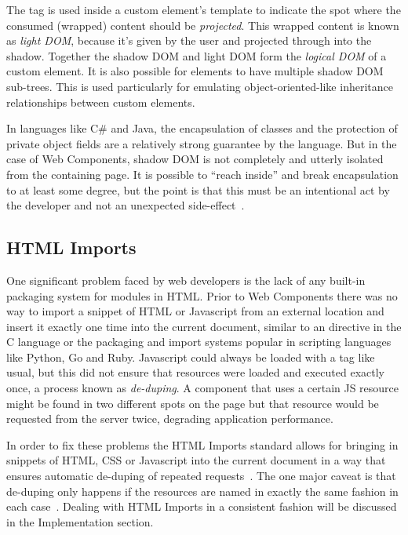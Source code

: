 The  tag is used inside a custom element's template to indicate the spot where the consumed (wrapped) content should be \textit{projected}. 
This wrapped content is known as 
\textit{light DOM}, 
because it's given by the user and projected through into the shadow.
Together the shadow DOM and light DOM form the \textit{logical DOM} of a custom element.
It is also possible for elements to have multiple shadow DOM sub-trees. 
This is used particularly for emulating object-oriented-like inheritance relationships between custom elements.

In languages like C\# and Java, the encapsulation of classes and the protection of private object fields are a relatively strong guarantee by the language.
But in the case of Web Components, shadow DOM is not completely and utterly isolated from the containing page.
It is possible to ``reach inside'' and break encapsulation to at least some degree, 
but the point is that this must be an intentional act by the developer and not an unexpected side-effect~\cite{bidelman2014}.

\subsection{HTML Imports}
One significant problem faced by web developers is the lack of any built-in packaging system for modules in HTML.
Prior to Web Components there was no way to import a snippet of HTML or Javascript from an external location and insert it exactly one time into the current document, 
similar to an  directive in the C language or the packaging and import systems popular in scripting languages like Python, Go and Ruby. 
Javascript could always be loaded with a  tag like usual, but this did not ensure that resources were loaded and executed exactly once, a process known as \textit{de-duping}.
A component that uses a certain JS resource might be found in two different spots on the page but that resource would be requested from the server twice, degrading application performance.

In order to fix these problems the HTML Imports standard allows for bringing in snippets of HTML, CSS or Javascript into the current document in a way that ensures automatic de-duping of repeated requests~\cite{w3ccontributors2015-a}.
The one major caveat is that de-duping only happens if the resources are named in exactly the same fashion in each case~\cite{bidelman2013}.
Dealing with HTML Imports in a consistent fashion will be discussed in the Implementation section.

